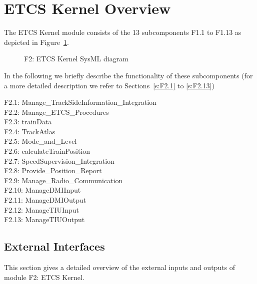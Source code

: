 \section{ETCS Kernel Overview}\label{s:ETCS_Kernel_Overview}

The ETCS Kernel module consists of the 13 subcomponents F1.1 to F1.13 as depicted in Figure~\ref{f:ETCS_Kernel}. 
\begin{figure}
\center
{}
\caption{F2: ETCS Kernel SysML diagram}\label{f:ETCS_Kernel}
\end{figure}
In the following we briefly describe the functionality of these subcomponents (for a more detailed description we refer to Sections~\ref{s:F2.1} to \ref{s:F2.13})
\begin{description}
\item[F2.1: Manage\_TrackSideInformation\_Integration] 
\item[F2.2: Manage\_ETCS\_Procedures] 
\item[F2.3: trainData] 
\item[F2.4: TrackAtlas] 
\item[F2.5: Mode\_and\_Level] 
\item[F2.6: calculateTrainPosition] 
\item[F2.7: SpeedSupervision\_Integration] 
\item[F2.8: Provide\_Position\_Report] 
\item[F2.9: Manage\_Radio\_Communication] 
\item[F2.10: ManageDMIInput] 
\item[F2.11: ManageDMIOutput] 
\item[F2.12: ManageTIUInput] 
\item[F2.13: ManageTIUOutput] 
\end{description}


\subsection{External Interfaces}
This section gives a detailed overview of the external inputs and outputs of module F2: ETCS Kernel.

